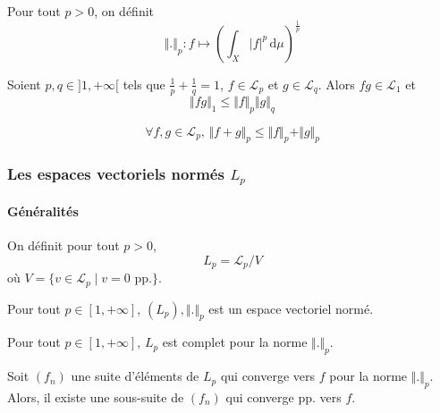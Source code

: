   \begin{definition}
    Pour tout $p > 0$, on définit
    \[ \Vert . \Vert_p : f \mapsto \left( \int_X \vert f \vert^p \, \mathrm{d}\mu \right)^{\frac{1}{p}} \]
  \end{definition}

  \begin{theorem}
    Soient $p, q \in ]1, +\infty[$ tels que $\frac{1}{p} + \frac{1}{q} = 1$, $f \in \mathcal{L}_p$ et $g \in \mathcal{L}_q$. Alors $fg \in \mathcal{L}_1$ et
    \[ \Vert fg \Vert_1 \leq \Vert f \Vert_p \Vert g \Vert_q \]
  \end{theorem}

  \begin{theorem}
    \[ \forall f, g \in \mathcal{L}_p, \, \Vert f + g \Vert_p \leq \Vert f \Vert_p + \Vert g \Vert_p \]
  \end{theorem}

  \subsubsection{Les espaces vectoriels normés \texorpdfstring{$L_p$}{Lₚ}}

  \paragraph{Généralités}


  \begin{definition}
    On définit pour tout $p > 0$,
    \[ L_p = \mathcal{L}_p / V \]
    où $V = \{ v \in \mathcal{L}_p \mid v = 0 \text{ pp.} \}$.
  \end{definition}

  \begin{theorem}
    Pour tout $p \in [1, +\infty]$, $(L_p), \Vert . \Vert_p$ est un espace vectoriel normé.
  \end{theorem}

  \begin{theorem}
    Pour tout $p \in [1, +\infty]$, $L_p$ est complet pour la norme $\Vert . \Vert_p$.
  \end{theorem}

  \begin{theorem}
    Soit $(f_n)$ une suite d'éléments de $L_p$ qui converge vers $f$ pour la norme $\Vert . \Vert_p$. Alors, il existe une sous-suite de $(f_n)$ qui converge pp. vers $f$.
  \end{theorem}

